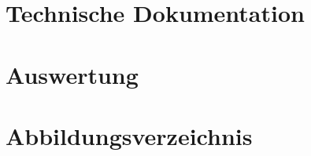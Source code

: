 \documentclass[journal]{IEEEtran}
\begin{document}
\lipsum

\section{Technische Dokumentation}

\lipsum

\section{Auswertung}

\lipsum

\section{Abbildungsverzeichnis}



\end{document}

